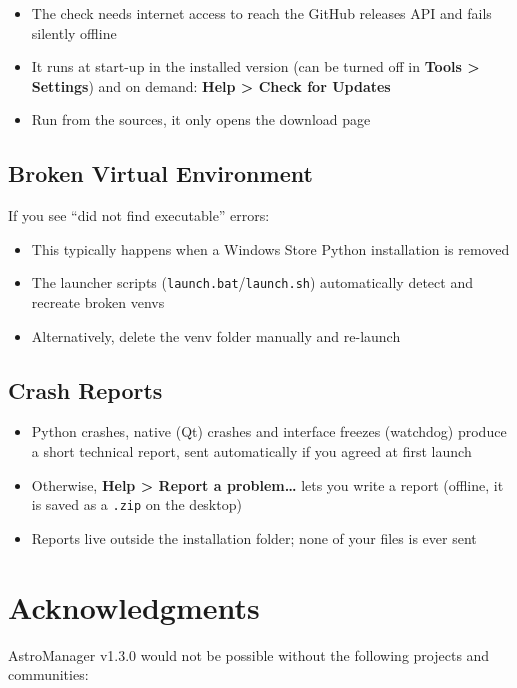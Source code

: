 \documentclass[11pt,a4paper]{article}
\newcommand{\menu}[1]{\textsf{\textbf{\textcolor{sky}{#1}}}}
\begin{document}
\begin{itemize}
    \item The check needs internet access to reach the GitHub releases API and
    fails silently offline
    \item It runs at start-up in the installed version (can be turned off in
    \menu{Tools > Settings}) and on demand: \menu{Help > Check for Updates}
    \item Run from the sources, it only opens the download page
\end{itemize}
\subsection{Broken Virtual Environment}

If you see ``did not find executable'' errors:
\begin{itemize}
    \item This typically happens when a Windows Store Python installation is removed
    \item The launcher scripts (\texttt{launch.bat}/\texttt{launch.sh}) automatically detect and recreate broken venvs
    \item Alternatively, delete the venv folder manually and re-launch
\end{itemize}

\subsection{Crash Reports}

\begin{itemize}
    \item Python crashes, native (Qt) crashes and interface freezes (watchdog)
    produce a short technical report, sent automatically if you agreed at first
    launch
    \item Otherwise, \menu{Help > Report a problem\dots} lets you write a report
    (offline, it is saved as a \texttt{.zip} on the desktop)
    \item Reports live outside the installation folder; none of your files is
    ever sent
\end{itemize}
\section{Acknowledgments}
\label{sec:acknowledgments}

AstroManager v1.3.0 would not be possible without the following projects and communities:
\end{document}
